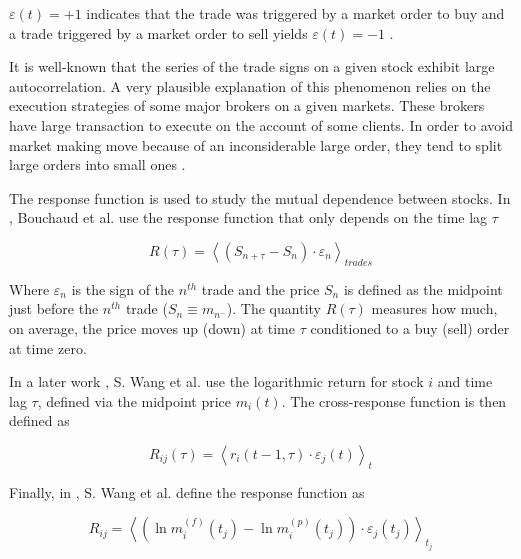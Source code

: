 $\varepsilon(t) = +1$ indicates that the trade was triggered by a market order
to buy and a trade triggered by a market order to sell yields
$\varepsilon(t) = -1$
\cite{subtle_nature,Bouchaud_2004,spread_changes_affect,quant_stock_price_response,order_flow_persistent}.

It is well-known that the series of the trade signs on a given stock exhibit
large autocorrelation. A very plausible explanation of this phenomenon relies
on the execution strategies of some major brokers on a given markets. These
brokers have large transaction to execute on the account of some clients. In
order to avoid market making move because of an inconsiderable large order,
they tend to split large orders into small ones \cite{empirical_facts}.

The response function is used to study the mutual dependence between stocks. In
\cite{r_walks_liquidity,Bouchaud_2004}, Bouchaud et al. use the response
function that only depends on the time lag $\tau$

\begin{equation}\label{eq:Bouchaud_2004}
    R\left(\tau\right)=\left\langle \left(S_{n+\tau}-S_{n}\right) \cdot
    \varepsilon_{n}\right\rangle_{trades}
\end{equation}

Where $\varepsilon_{n}$ is the sign of the $n^{th}$ trade and the price $S_n$
is defined as the midpoint just before the $n^{th}$ trade
($S_{n} \equiv m_{n^{-}}$).
The quantity $R\left(\tau\right)$ measures how much, on average, the price
moves up (down) at time $\tau$ conditioned to a buy (sell) order at time zero.

In a later work \cite{Wang_2016_cross}, S. Wang et al. use the logarithmic
return for stock $i$ and time lag $\tau$, defined via the midpoint price
$m_{i} \left( t \right)$. The cross-response function is then defined as

\begin{equation}\label{eq:Wang_2016}
    R_{ij}\left(\tau\right)=\left\langle r_{i}\left(t-1,\tau\right)\cdot
    \varepsilon_{j} \left(t\right) \right\rangle _{t}
\end{equation}

Finally, in \cite{Wang_2018_b}, S. Wang et al. define the response function as

\begin{equation}\label{eq:Wang_2018_b}
    R_{ij} = \left\langle \left(\ln m_{i}^{\left(f\right)}\left(t_{j}\right)-
    \ln m_{i}^{\left(p\right)} \left(t_{j}\right) \right)\cdot\varepsilon_{j}
    \left(t_{j}\right)\right\rangle _{t_{j}}
\end{equation}

